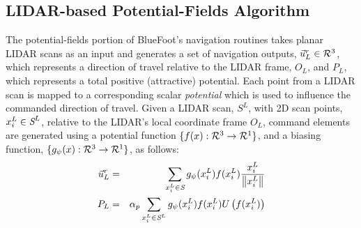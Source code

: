 		\subsection{LIDAR-based Potential-Fields Algorithm}

			The potential-fields portion of BlueFoot's navigation routines takes planar LIDAR scans as an input and generates a set of navigation outputs, $\vec{u}^{r}_{L} \in {\cal R}^{3}$, which represents a direction of travel relative to the LIDAR frame, $O_{L}$, and $P_{L}$, which represents a total positive (attractive) potential. Each point from a LIDAR scan is mapped to a corresponding scalar \emph{potential} which is used to influence the commanded direction of travel. Given a LIDAR scan, $S^{L}$, with 2D scan points, $x_{i}^{L}\in\emph{S}^{L}$, relative to the LIDAR's local coordinate frame $O_{L}$, command elements are generated using a potential function $\{ f(x) : {\cal R}^{3}\rightarrow {\cal R}^{1} \}$, and a biasing function, $\{ g_{\psi}(x) : {\cal R}^{3}\rightarrow {\cal R}^{1} \}$, as follows:
				\begin{eqnarray}
					\vec{u}^{r}_{L} &=&  { \sum_{x_{i}^{L} \in \emph{S}} g_{\psi}(x_{i}^{L})  f( x_{i}^{L} ) \frac{x_{i}^{L}}{\left\lVert x_{i}^{L}\right\rVert} } \nonumber \\
					P_{L} & = & \alpha_{p}\sum_{x_{i}^{L} \in \emph{S}^{L}} g_{\psi}(x_{i}^{L})  f( x_{i}^{L} ) U\left(f( x_{i}^{L} )\right)
					\label{eq::full_potential_fields}
				\end{eqnarray}

